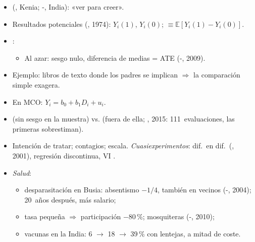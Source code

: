\documentclass{article}
\begin{document}
\begin{columnas}
\begin{itemize}
\item {} (, Kenia; -, India): «ver para creer».
\item Resultados potenciales (, 1974): $Y_i(1)$, $Y_i(0)$;  $\equiv\mathbb{E}[Y_i(1)-Y_i(0)]$.
\item {}:
  \begin{itemize}
  \item Al azar: sesgo nulo, diferencia de medias = ATE (-, 2009).
  \end{itemize}
\item Ejemplo: libros de texto donde los padres se implican $\Rightarrow$ la comparación simple exagera.
\item En MCO: $Y_i=b_0+b_1D_i+u_i$.
\item {} (sin sesgo en la muestra) vs.  (fuera de ella; , 2015: 111~evaluaciones, las primeras sobrestiman).
\item Intención de tratar; contagios; escala. \emph{Cuasiexperimentos}: dif.\ en dif.\ (, 2001), regresión discontinua, VI .
\end{itemize}
\begin{itemize}
\item \emph{Salud}:
  \begin{itemize}
  \item desparasitación en Busia: absentismo $-1/4$, también en vecinos (-, 2004); 20~años después, más salario;
  \item tasa pequeña $\Rightarrow$ participación $-80$\,\%; mosquiteras (-, 2010);
  \item vacunas en la India: 6 $\to$ 18 $\to$ 39\,\% con lentejas, a mitad de coste.
  \end{itemize}

\end{itemize}
\end{columnas}
\end{document}
